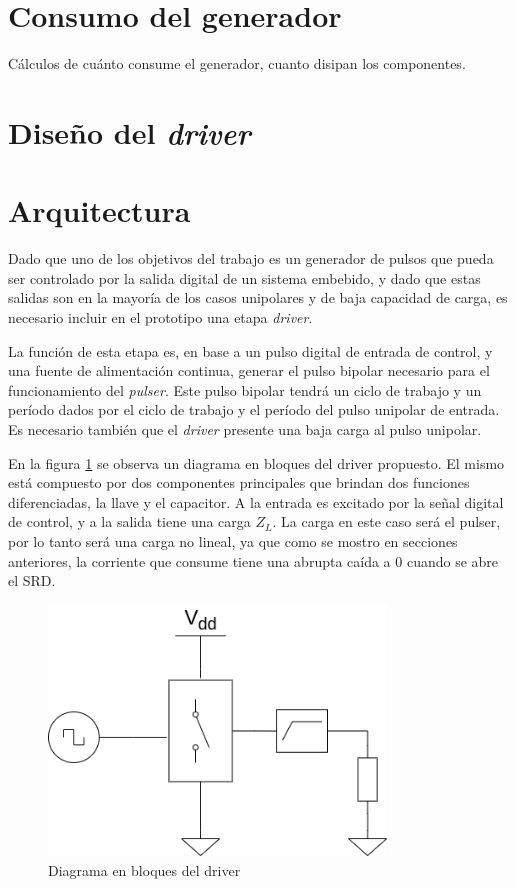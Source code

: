 \section{Consumo del generador}

Cálculos de cuánto consume el generador, cuanto disipan los componentes.

\section{Diseño del \textit{driver}}

\section{Arquitectura}

Dado que uno de los objetivos del trabajo es un generador de pulsos que pueda
ser controlado por la salida digital de un sistema embebido, y dado que estas
salidas son en la mayoría de los casos unipolares y de baja capacidad de carga,
es necesario incluir en el prototipo una etapa \textit{driver}.

La función de esta etapa es, en base a un pulso digital de entrada de control, y
una fuente de alimentación continua, generar el pulso bipolar necesario para el
funcionamiento del \textit{pulser}. Este pulso bipolar tendrá un ciclo de
trabajo y un período dados por el ciclo de trabajo y el período del pulso
unipolar de entrada. Es necesario también que el \textit{driver} presente una
baja carga al pulso unipolar.

En la figura \ref{fig:driver_block_diagram} se observa un diagrama en bloques
del driver propuesto. El mismo está compuesto por dos componentes principales
que brindan dos funciones diferenciadas, la llave y el capacitor. A la entrada
es excitado por la señal digital de control, y a la salida tiene una carga
$Z_L$. La carga en este caso será el pulser, por lo tanto será una carga no
lineal, ya que como se mostro en secciones anteriores, la corriente que consume
tiene una abrupta caída a 0 cuando se abre el SRD.

\begin{figure}[tbp]
    \centering
    \includegraphics[width=0.8\textwidth]{images/driver.drawio.png}
    \caption{Diagrama en bloques del driver}
    \label{fig:driver_block_diagram}
\end{figure}

